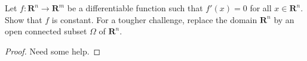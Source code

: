 \begin{exercise}\label{ex 6.3.4}
    Let \(f : \mathbf{R}^n \to \mathbf{R}^m\) be a differentiable function such that \(f'(x) = 0\) for all \(x \in \mathbf{R}^n\).
    Show that \(f\) is constant.
    For a tougher challenge, replace the domain \(\mathbf{R}^n\) by an open connected subset \(\Omega\) of \(\mathbf{R}^n\).
\end{exercise}

\begin{proof}
    Need some help.
\end{proof}